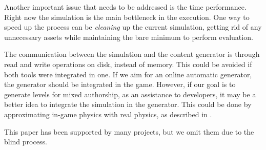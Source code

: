 \documentclass[sigconf]{acmart}
\begin{document}




Another important issue that needs to be addressed is the time performance. 
Right now the simulation is the main bottleneck in the execution. One way to 
speed up the process can be \textit{cleaning} up the current simulation, getting 
rid of any unnecessary assets while maintaining the bare minimum to
perform evaluation. 

The communication between the simulation and the content generator is through 
read and write operations on disk, instead of memory. This could be avoided if 
both tools were integrated in one. If we aim for an online automatic generator, 
the generator should be integrated in the game. However, if our goal is to 
generate levels for mixed authorship, as an assistance to developers, it may be 
a better idea to integrate the simulation in the generator. This could be done 
by approximating in-game physics with real physics, as described in 
\cite{blum1970stability}. %



\begin{acks}
This paper has been supported by many projects, but we omit them due to the blind process.
\end{acks}

%

 
\end{document}

